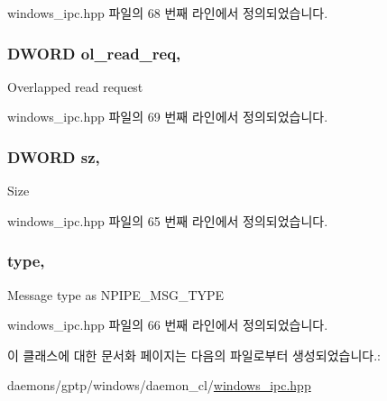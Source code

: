 windows\+\_\+ipc.\+hpp 파일의 68 번째 라인에서 정의되었습니다.

\subsubsection[{\texorpdfstring{ol\+\_\+read\+\_\+req}{ol_read_req}}]{\setlength{\rightskip}{0pt plus 5cm}D\+W\+O\+RD ol\+\_\+read\+\_\+req\hspace{0.3cm}{\ttfamily [protected]}, {\ttfamily [inherited]}}\hypertarget{class_windows_n_pipe_message_a00febefc15f04548b030593221502d72}{}\label{class_windows_n_pipe_message_a00febefc15f04548b030593221502d72}
Overlapped read request 

windows\+\_\+ipc.\+hpp 파일의 69 번째 라인에서 정의되었습니다.

\subsubsection[{\texorpdfstring{sz}{sz}}]{\setlength{\rightskip}{0pt plus 5cm}D\+W\+O\+RD sz\hspace{0.3cm}{\ttfamily [protected]}, {\ttfamily [inherited]}}\hypertarget{class_windows_n_pipe_message_a09171c54248e2b5629cb28432fc246f7}{}\label{class_windows_n_pipe_message_a09171c54248e2b5629cb28432fc246f7}
Size 

windows\+\_\+ipc.\+hpp 파일의 65 번째 라인에서 정의되었습니다.

\subsubsection[{\texorpdfstring{type}{type}}]{ type\hspace{0.3cm}{\ttfamily [protected]}, {\ttfamily [inherited]}}\hypertarget{class_windows_n_pipe_message_af23d76d201079e292145d5f0acda4940}{}\label{class_windows_n_pipe_message_af23d76d201079e292145d5f0acda4940}
Message type as N\+P\+I\+P\+E\+\_\+\+M\+S\+G\+\_\+\+T\+Y\+PE 

windows\+\_\+ipc.\+hpp 파일의 66 번째 라인에서 정의되었습니다.



이 클래스에 대한 문서화 페이지는 다음의 파일로부터 생성되었습니다.\+:\begin{DoxyCompactItemize}
\item 
daemons/gptp/windows/daemon\+\_\+cl/\hyperlink{windows__ipc_8hpp}{windows\+\_\+ipc.\+hpp}\end{DoxyCompactItemize}
